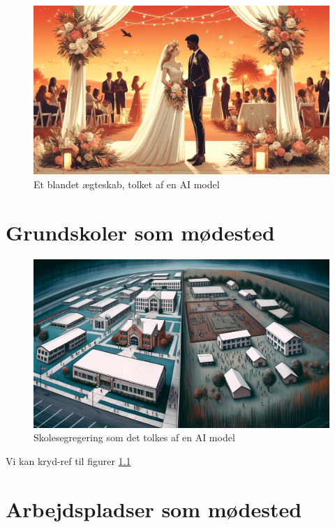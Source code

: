 \documentclass[
]{book}
\begin{document}
\begin{figure}
\includegraphics[width=24.89in]{images/dalle-wedding} \caption{Et blandet ægteskab, tolket af en AI model}\label{fig:fig-partner}
\end{figure}

\hypertarget{kap3}{%
\chapter{Grundskoler som mødested}\label{kap3}}

\begin{figure}
\includegraphics[width=24.89in]{images/dalle-schoolseg} \caption{Skolesegregering som det tolkes af en AI model}\label{fig:fig-schoolseg}
\end{figure}

Vi kan kryd-ref til figurer \ref{fig:fig-schoolseg}

\hypertarget{kap4}{%
\chapter{Arbejdspladser som mødested}\label{kap4}}
\end{document}
